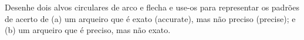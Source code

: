 Desenhe dois alvos circulares de arco e flecha e use-os para representar os padrões de acerto de (a) um arqueiro que é exato (accurate), mas não preciso (precise); e (b) um arqueiro que é preciso, mas não exato.

